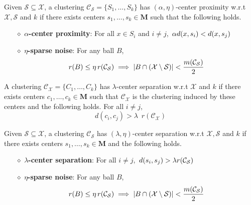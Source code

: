 \documentclass[orivec]{llncs}
\newcommand{\mc}{\mathcal}
\newcommand{\mb}{\mathbf}
\begin{document}
\begin{definition}
\label{def:alphaeta}
Given $\mc S \subseteq \mc X$, a clustering $\mc C_{\mc S} = \{S_1, \ldots, S_k\}$ has $(\alpha, \eta)$-center proximity w.r.t $\mc X, \mc S$ and $k$ if there exists centers $s_1, \ldots, s_k \in \mb M$  such that the following holds.
\begin{itemize}[nolistsep, noitemsep]
\label{defn:alphacpnoise}	

\item[$\diamond$] {\bf $\alpha$-center proximity}: For all $x \in S_i$ and $i\neq j$, $\thinspace\alpha d(x, s_i) < d(x, s_j)$
\item[$\diamond$]{\bf $\eta$-sparse noise}: For any ball $B$, 
\vspace{-0.1in}\begin{align*}
r(B)\leq \eta \thinspace r(\mc{C}_{\mc S}) \implies |B\cap (\mc X\setminus \mc S)| < \frac{m(\mc C_{\mc S})}{2}
\end{align*}
\end{itemize}
\end{definition}

\begin{definition}
\label{defn:lambdacs}
A clustering $\mc C_{\mc X} = \{C_1, \ldots, C_k\}$ has $\lambda$-center separation w.r.t $\mc X$ and $k$ if there exists centers $c_1, \ldots, c_k \in \mb M$ such that $\mc C_{\mc X}$ is the clustering induced by these centers and the following holds. For all $i\neq j$, 
$$d(c_i, c_j) > \lambda \enspace r(\mc{C}_{\mc{X}})$$
\end{definition}

\begin{definition}
Given $\mc S \subseteq \mc X$, a clustering $\mc C_{\mc S}$ has $(\lambda, \eta)$-center separation w.r.t $\mc X, \mc S$ and $k$ if there exists centers $s_1, \ldots, s_k \in \mb M$ and the following holds.

\begin{itemize}[nolistsep, noitemsep]
\label{defn:lambdacsnoise}	

\item[$\diamond$] {\bf $\lambda$-center separation}: For all $i\neq j$, $\thinspace d(s_i, s_j) > \lambda r({\mc C}_{\mc S})$
\item[$\diamond$]{\bf $\eta$-sparse noise}: For any ball $B$, 
\vspace{-0.1in}\begin{align*}
r(B)\leq \eta \thinspace r(\mc{C}_{\mc S}) \implies |B\cap (\mc X\setminus \mc S)| < \frac{m(\mc C_{\mc S})}{2}
\end{align*}
\end{itemize}
\end{definition}
\end{document}
